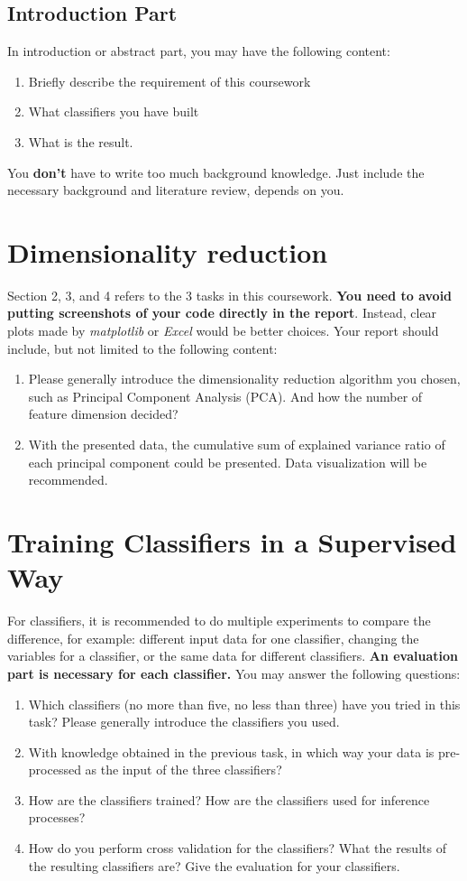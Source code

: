 \documentclass[10pt,twocolumn]{article}
\begin{document}
\subsection{Introduction Part}
In introduction or abstract part, you may have the following content:
\begin{enumerate}
    \item Briefly describe the requirement of this coursework
    \item What classifiers you have built
    \item What is the result.
\end{enumerate}

You \textbf{don't} have to write too much background knowledge. Just include the necessary background and literature review, depends on you.


\section{Dimensionality reduction}
Section 2, 3, and 4 refers to the 3 tasks in this coursework. \textbf{You need to avoid putting screenshots of your code directly in the report}. Instead, clear plots made by \textit{matplotlib} or \textit{Excel} would be better choices.
Your report should include, but not limited to the following content:
\begin{enumerate}
    \item Please generally introduce the dimensionality reduction algorithm you chosen, such as Principal Component Analysis (PCA). And how the number of feature dimension decided? 
    \item With the presented data, the cumulative sum of explained variance ratio of each principal component could be presented. Data visualization will be recommended.
\end{enumerate}

\section{Training Classifiers in a Supervised Way}
For classifiers, it is recommended to do multiple experiments to compare the difference, for example: different input data for one classifier, changing the variables for a classifier, or the same data for different classifiers. \textbf{An evaluation part is necessary for each classifier.}
You may answer the following questions:

\begin{enumerate}
    \item Which classifiers (no more than five, no less than three) have you tried in this task? Please generally introduce the classifiers you used.
    \item With knowledge obtained in the previous task, in which way your data is pre-processed as the input of the three classifiers?
    \item How are the classifiers trained? How are the classifiers used for inference processes? 
    \item How do you perform cross validation for the classifiers? What the results of the resulting classifiers are? Give the evaluation for your classifiers.
\end{enumerate}
\end{document}
